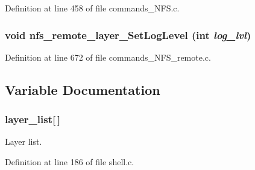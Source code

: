 Definition at line 458 of file commands\_\-NFS.c.
\subsubsection[{nfs\_\-remote\_\-layer\_\-SetLogLevel}]{\setlength{\rightskip}{0pt plus 5cm}void nfs\_\-remote\_\-layer\_\-SetLogLevel (int {\em log\_\-lvl})}\label{commands_8h_afddec7649e50bfe452db28ba44df4b7}




Definition at line 672 of file commands\_\-NFS\_\-remote.c.

\subsection{Variable Documentation}
\subsubsection[{layer\_\-list}]{ {\bf layer\_\-list}[$\,$]}\label{commands_8h_e751cf5f3c0928b64ffd28ab9b1fe17d}


Layer list. 

Definition at line 186 of file shell.c.